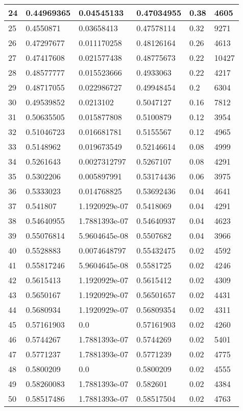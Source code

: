 \begin{longtable}{|l|l|l|l|l|l|}
24 & 0.44969365 & 0.04545133 & 0.47034955 & 0.38 & 4605 \\ \hline 
25 & 0.4550871 & 0.03658413 & 0.47578114 & 0.32 & 9271 \\ \hline 
26 & 0.47297677 & 0.011170258 & 0.48126164 & 0.26 & 4613 \\ \hline 
27 & 0.47417608 & 0.021577438 & 0.48775673 & 0.22 & 10427 \\ \hline 
28 & 0.48577777 & 0.015523666 & 0.4933063 & 0.22 & 4217 \\ \hline 
29 & 0.48717055 & 0.022986727 & 0.49948454 & 0.2 & 6304 \\ \hline 
30 & 0.49539852 & 0.0213102 & 0.5047127 & 0.16 & 7812 \\ \hline 
31 & 0.50635505 & 0.015877808 & 0.5100879 & 0.12 & 3954 \\ \hline 
32 & 0.51046723 & 0.016681781 & 0.5155567 & 0.12 & 4965 \\ \hline 
33 & 0.5148962 & 0.019673549 & 0.52146614 & 0.08 & 4999 \\ \hline 
34 & 0.5261643 & 0.0027312797 & 0.5267107 & 0.08 & 4291 \\ \hline 
35 & 0.5302206 & 0.005897991 & 0.53174436 & 0.06 & 3975 \\ \hline 
36 & 0.5333023 & 0.014768825 & 0.53692436 & 0.04 & 4641 \\ \hline 
37 & 0.541807 & 1.1920929e-07 & 0.5418069 & 0.04 & 4291 \\ \hline 
38 & 0.54640955 & 1.7881393e-07 & 0.54640937 & 0.04 & 4623 \\ \hline 
39 & 0.55076814 & 5.9604645e-08 & 0.5507682 & 0.04 & 3966 \\ \hline 
40 & 0.5528883 & 0.0074648797 & 0.55432475 & 0.02 & 4592 \\ \hline 
41 & 0.55817246 & 5.9604645e-08 & 0.5581725 & 0.02 & 4246 \\ \hline 
42 & 0.5615413 & 1.1920929e-07 & 0.5615412 & 0.02 & 4309 \\ \hline 
43 & 0.5650167 & 1.1920929e-07 & 0.56501657 & 0.02 & 4431 \\ \hline 
44 & 0.5680934 & 1.1920929e-07 & 0.56809354 & 0.02 & 4311 \\ \hline 
45 & 0.57161903 & 0.0 & 0.57161903 & 0.02 & 4260 \\ \hline 
46 & 0.5744267 & 1.7881393e-07 & 0.5744269 & 0.02 & 5401 \\ \hline 
47 & 0.5771237 & 1.7881393e-07 & 0.5771239 & 0.02 & 4775 \\ \hline 
48 & 0.5800209 & 0.0 & 0.5800209 & 0.02 & 4555 \\ \hline 
49 & 0.58260083 & 1.7881393e-07 & 0.582601 & 0.02 & 4384 \\ \hline 
50 & 0.58517486 & 1.7881393e-07 & 0.58517504 & 0.02 & 4763 \\ \hline 
\end{longtable}